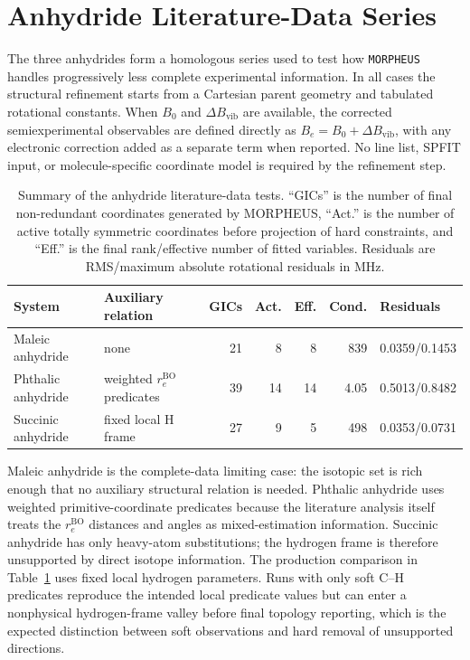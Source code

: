 \documentclass[12pt]{article}
\begin{document}
\section{Anhydride Literature-Data Series}

The three anhydrides form a homologous series used to test how
\texttt{MORPHEUS} handles progressively less complete experimental
information. In all cases the structural refinement starts from a Cartesian
parent geometry and tabulated rotational constants. When $B_0$ and
$\Delta B_\mathrm{vib}$ are available, the corrected semiexperimental
observables are defined directly as $B_e=B_0+\Delta B_\mathrm{vib}$, with any
electronic correction added as a separate term when reported. No line list,
SPFIT input, or molecule-specific coordinate model is required by the
refinement step.

\begin{table}
\caption{Summary of the anhydride literature-data tests. ``GICs'' is the
number of final non-redundant coordinates generated by MORPHEUS, ``Act.'' is
the number of active totally symmetric coordinates before projection of hard
constraints, and ``Eff.'' is the final rank/effective number of fitted
variables. Residuals are RMS/maximum absolute rotational residuals in MHz.}
\label{tab:si-anhydride-series}
\scriptsize
\setlength{\tabcolsep}{3pt}
\begin{tabular}{llrrrrl}
\toprule
System & Auxiliary relation & GICs & Act. & Eff. & Cond. & Residuals \\
\midrule
Maleic anhydride & none & 21 & 8 & 8 & 839 & 0.0359/0.1453 \\
Phthalic anhydride & weighted $r_e^\mathrm{BO}$ predicates & 39 & 14 & 14 & 4.05 & 0.5013/0.8482 \\
Succinic anhydride & fixed local H frame & 27 & 9 & 5 & 498 & 0.0353/0.0731 \\
\bottomrule
\end{tabular}
\end{table}

Maleic anhydride is the complete-data limiting case: the isotopic set is rich
enough that no auxiliary structural relation is needed. Phthalic anhydride
uses weighted primitive-coordinate predicates because the literature analysis
itself treats the $r_e^\mathrm{BO}$ distances and angles as mixed-estimation
information. Succinic anhydride has only heavy-atom substitutions; the
hydrogen frame is therefore unsupported by direct isotope information. The
production comparison in Table~\ref{tab:si-anhydride-series} uses fixed local
hydrogen parameters. Runs with only soft C--H predicates reproduce the intended
local predicate values but can enter a nonphysical hydrogen-frame valley before
final topology reporting, which is the expected distinction between soft
observations and hard removal of unsupported directions.
\end{document}
